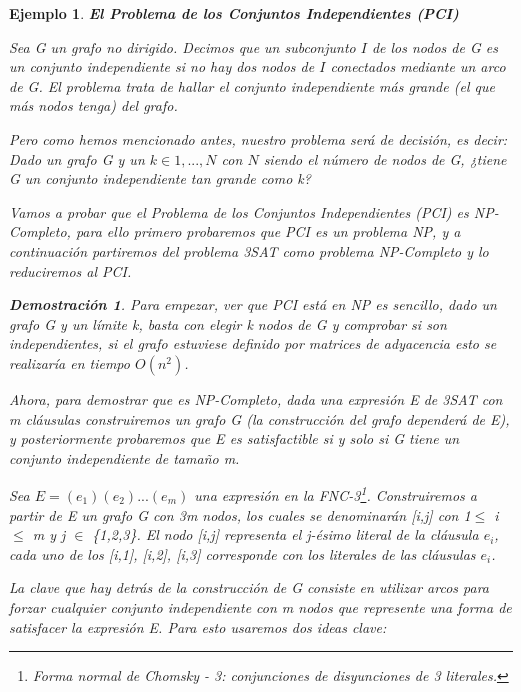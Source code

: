 \documentclass[a4paper,12pt,titlepage]{article}
\newtheorem{eje}{Ejemplo}[section]
\newtheorem*{dem}{\textbf{Demostraci\'on}}
\begin{document}
\begin{eje}

\textbf{El Problema de los Conjuntos Independientes (PCI)}
\vspace{\baselineskip}

Sea G un grafo no dirigido. Decimos que un subconjunto $I$ de los nodos de G es un conjunto independiente si no hay dos nodos de $I$ conectados mediante un arco de G. El problema trata de hallar el conjunto independiente m\'as grande (el que m\'as nodos tenga) del grafo.

Pero como hemos mencionado antes, nuestro problema ser\'a de decisi\'on, es decir: Dado un grafo G y un $k \in {1,...,N}$ con $N$ siendo el n\'umero de nodos de G, ¿tiene G un conjunto independiente tan grande como k?

Vamos a probar que el Problema de los Conjuntos Independientes (PCI) es NP-Completo, para ello primero probaremos que PCI\cite{HopcroftESP} es un problema NP, y a continuaci\'on partiremos del problema 3SAT como problema NP-Completo y lo reduciremos al PCI.

\begin{dem}

Para empezar, ver que PCI est\'a en NP es sencillo, dado un grafo G y un l\'imite k, basta con elegir k nodos de G y comprobar si son independientes, si el grafo estuviese definido por matrices de adyacencia esto se realizar\'ia en tiempo $O(n^{2})$.

Ahora, para demostrar que es NP-Completo, dada una expresi\'on E de 3SAT con m cl\'ausulas construiremos un grafo G (la construcci\'on del grafo depender\'a de E), y posteriormente probaremos que E es satisfactible si y solo si G tiene un conjunto independiente de tamaño m.

Sea $E = (e_1)(e_2)...(e_m)$ una expresi\'on en la FNC-3\footnote{Forma normal de Chomsky - 3: conjunciones de disyunciones de 3 literales.}. Construiremos a partir de E un grafo G con 3m nodos, los cuales se denominar\'an [i,j] con 1$\leq$ i $\leq $ m y j $\in$ \{1,2,3\}. El nodo [i,j] representa el j-\'esimo literal de la cl\'ausula $e_i$, cada uno de los [i,1], [i,2], [i,3] corresponde con los literales de las cl\'ausulas $e_i$.

La clave que hay detr\'as de la construcci\'on de G consiste en utilizar arcos para forzar cualquier conjunto independiente con m nodos que represente una forma de satisfacer la expresi\'on E. Para esto usaremos dos ideas clave:

\begin{enumerate}


\end{enumerate}
\end{dem}
\end{eje}
\end{document}
